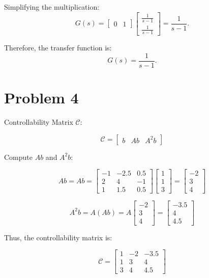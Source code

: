 \documentclass[12pt]{article}
\begin{document}
Simplifying the multiplication:
\[
G(s) = \begin{bmatrix}
0 & 1
\end{bmatrix} \begin{bmatrix}
\frac{1}{s-1} \\
\frac{1}{s-1}
\end{bmatrix} = \frac{1}{s-1}.
\]

Therefore, the transfer function is:
\[
G(s) = \frac{1}{s-1}.
\]

\section*{Problem 4}

Controllability Matrix \(\mathcal{C}\):

\[
\mathcal{C} = \begin{bmatrix} b & Ab & A^2b \end{bmatrix}
\]

Compute \( Ab \) and \( A^2b \):

\[
Ab = A b = \begin{bmatrix}
-1 & -2.5 & 0.5 \\
2 & 4 & -1 \\
1 & 1.5 & 0.5
\end{bmatrix}
\begin{bmatrix}
1 \\ 1 \\ 3
\end{bmatrix}
= \begin{bmatrix}
-2 \\
3 \\
4
\end{bmatrix}
\]

\[
A^2b = A (Ab) = A \begin{bmatrix}
-2 \\ 3 \\ 4
\end{bmatrix}
= \begin{bmatrix}
-3.5 \\
4 \\
4.5
\end{bmatrix}
\]

Thus, the controllability matrix is:

\[
\mathcal{C} = \begin{bmatrix}
1 & -2 & -3.5 \\
1 & 3 & 4 \\
3 & 4 & 4.5
\end{bmatrix}
\]
\end{document}
